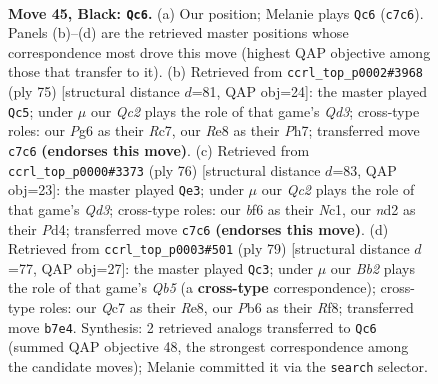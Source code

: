 \documentclass[11pt]{article}
\begin{document}
\clearpage

\begin{figure}[p]\centering
\begin{subfigure}{0.46\textwidth}\centering
\resizebox{\linewidth}{!}{%
\newchessgame
\chessboard[
  setfen={1r2r3/Rbq2p1k/1p3Bp1/8/7P/1P6/2PN1Q2/R2B2K1 b - - 4 45},
  showmover=false,
  pgfstyle=straightmove, color=movearrow, markmove={c7-c6}
]}
\caption{}
\end{subfigure}\hfill
\begin{subfigure}{0.46\textwidth}\centering
\resizebox{\linewidth}{!}{%
\newchessgame
\chessboard[
  setfen={6k1/2r3pp/3q4/pB1pr3/P2R4/8/KPPQ2PP/8 b - - 2 38},
  showmover=false,
  pgfstyle=straightmove, color=movearrow, markmove={d6-c5}
]}
\caption{}
\end{subfigure}
\\[4pt]
\begin{subfigure}{0.46\textwidth}\centering
\resizebox{\linewidth}{!}{%
\newchessgame
\chessboard[
  setfen={1q6/rnrb2pk/2p4p/4Pp2/1R1P4/3Q4/5PB1/1RN3K1 w - - 3 39},
  showmover=false,
  pgfstyle=straightmove, color=movearrow, markmove={d3-e3}
]}
\caption{}
\end{subfigure}\hfill
\begin{subfigure}{0.46\textwidth}\centering
\resizebox{\linewidth}{!}{%
\newchessgame
\chessboard[
  setfen={4rr1k/6pp/5p2/8/nqpR2B1/7P/5PP1/QR4K1 b - - 11 40},
  showmover=false,
  pgfstyle=straightmove, color=movearrow, markmove={b4-c3}
]}
\caption{}
\end{subfigure}
\caption{\textbf{Move 45, Black: \texttt{Qc6}.} (a) Our position; Melanie plays \texttt{Qc6} (\texttt{c7c6}). Panels (b)--(d) are the retrieved master positions whose correspondence most drove this move (highest QAP objective among those that transfer to it). (b) Retrieved from \texttt{ccrl\_top\_p0002\#3968} (ply 75) [structural distance $d$=81, QAP obj=24]: the master played \texttt{Qc5}; under $\mu$ our \emph{Qc2} plays the role of that game's \emph{Qd3}; cross-type roles: our \emph{P}g6 as their \emph{R}c7, our \emph{R}e8 as their \emph{P}h7; transferred move \texttt{c7c6} \textbf{(endorses this move)}. (c) Retrieved from \texttt{ccrl\_top\_p0000\#3373} (ply 76) [structural distance $d$=83, QAP obj=23]: the master played \texttt{Qe3}; under $\mu$ our \emph{Qc2} plays the role of that game's \emph{Qd3}; cross-type roles: our \emph{b}f6 as their \emph{N}c1, our \emph{n}d2 as their \emph{P}d4; transferred move \texttt{c7c6} \textbf{(endorses this move)}. (d) Retrieved from \texttt{ccrl\_top\_p0003\#501} (ply 79) [structural distance $d$=77, QAP obj=27]: the master played \texttt{Qc3}; under $\mu$ our \emph{Bb2} plays the role of that game's \emph{Qb5} (a \textbf{cross-type} correspondence); cross-type roles: our \emph{Q}c7 as their \emph{R}e8, our \emph{P}b6 as their \emph{R}f8; transferred move \texttt{b7e4}. Synthesis: 2 retrieved analogs transferred to \texttt{Qc6} (summed QAP objective 48, the strongest correspondence among the candidate moves); Melanie committed it via the \texttt{search} selector.}
\label{fig:thought-m89}
\end{figure}
\end{document}
